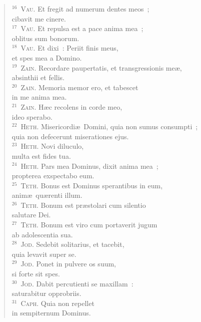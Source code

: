 \begin{flushleft}
\begin{verse}
${}^{16}$~\textsc{Vau.} Et fregit ad numerum dentes meos~;\\ cibavit me cinere.\\
${}^{17}$~\textsc{Vau.} Et repulsa est a pace anima mea~;\\ oblitus sum bonorum.\\
${}^{18}$~\textsc{Vau.} Et dixi~: Periit finis meus,\\ et spes mea a Domino.\\
${}^{19}$~\textsc{Zain.} Recordare paupertatis, et transgressionis me\ae ,\\ absinthii et fellis.\\
${}^{20}$~\textsc{Zain.} Memoria memor ero, et tabescet\\ in me anima mea.\\
${}^{21}$~\textsc{Zain.} H\ae c recolens in corde meo,\\ ideo sperabo.\\
${}^{22}$~\textsc{Heth.} Misericordi\ae\ Domini, quia non sumus consumpti~;\\ quia non defecerunt miserationes ejus.\\
${}^{23}$~\textsc{Heth.} Novi diluculo,\\ multa est fides tua.\\
${}^{24}$~\textsc{Heth.} Pars mea Dominus, dixit anima mea~;\\ propterea exspectabo eum.\\
${}^{25}$~\textsc{Teth.} Bonus est Dominus sperantibus in eum,\\ anim\ae\ qu\ae renti illum.\\
${}^{26}$~\textsc{Teth.} Bonum est pr\ae stolari cum silentio\\ salutare Dei.\\
${}^{27}$~\textsc{Teth.} Bonum est viro cum portaverit jugum\\ ab adolescentia sua.\\
${}^{28}$~\textsc{Jod.} Sedebit solitarius, et tacebit,\\ quia levavit super se.\\
${}^{29}$~\textsc{Jod.} Ponet in pulvere os suum,\\ si forte sit spes.\\
${}^{30}$~\textsc{Jod.} Dabit percutienti se maxillam~:\\ saturabitur opprobriis.\\
${}^{31}$~\textsc{Caph.} Quia non repellet\\ in sempiternum Dominus.\\

\end{verse}
\end{flushleft}
